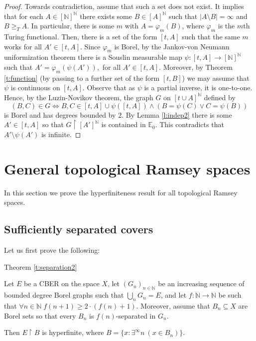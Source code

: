 \documentclass[11pt]{amsart}
\newcommand{\thistheoremname}{}
\newtheorem*{genericthm*}{\thistheoremname}
\newenvironment{namedthm*}[1]
{\renewcommand{\thistheoremname}{#1}%
	\begin{genericthm*}}
	{\end{genericthm*}}
\newcommand{\N}{\mathbb{N}}
\renewcommand{\restriction}[2]{#1 \upharpoonright #2}
\theoremstyle{definition}
\numberwithin{equation}{section}
\begin{document}
	\begin{proof}
		Towards contradiction, assume that such a set does not exist. It implies that for each $A \in [\N]^\N$ there exists some $B \in [A]^\N$ such that $|A \setminus B|=\infty$ and $B \geq_T A$. In particular, there is some $m$ with $A=\varphi_m(B)$, where $\varphi_m$ is the $m$th Turing functional. Then, there is a set of the form $[t,A]$ such that the same $m$ works for all $A' \in [t,A]$. Since $\varphi_m$ is Borel, by the Jankov-von Neumann uniformization theorem there is a Souslin measurable map $\psi: [t,A] \to [\N]^\N$ such that $A'=\varphi_m(\psi(A')),$ for all $A' \in [t,A].$ Moreover, by Theorem \ref{t:function} (by passing to a further set of the form $[t,B]$) we may assume that $\psi$ is continuous on $[t,A]$. Observe that as $\psi$ is a partial inverse, it is one-to-one. Hence, by the Luzin-Novikov theorem, the graph $G$ on $[t\cup A]^\N$ defined by \[(B,C) \in G \iff B,C \in [t,A] \cup \psi([t,A]) \land (B=\psi(C) \lor C=\psi(B))\] is Borel and has degrees bounded by $2$. By Lemma \ref{l:indep2} there is some $A' \in [t,A]$ so that $\restriction{G}{[A']^\N}$ is contained in $\mathbb{E}_0$. This contradicts that $A' \setminus \psi(A')$ is infinite. 
	\end{proof}
	
	
	
	
	
	\section{General topological Ramsey spaces}
	
	\label{s:main}
	
	In this section we prove the hyperfiniteness result for all topological Ramsey spaces. 
	\subsection{Sufficiently separated covers}
	\label{s:suffsep}
	
	Let us first prove the following:
	\begin{namedthm*}{Theorem \ref{t:separation2}}
		
		Let $E$ be a CBER on the space $X$, let $(G_n)_{n \in \N}$ be an increasing sequence of bounded degree Borel graphs such that $\bigcup_n G_n=E$, and let $f:\N\to\N$ be such that $\forall n\in\N\; f(n+1)\ge2\cdot(f(n)+1)$. Moreover, assume that $B_n \subseteq X$ are Borel sets so that every $B_n$ is $f(n)$-separated in $G_n$. 
		
		Then $\restriction{E}{B}$ is hyperfinite, where $B=\{x:\exists^\infty n \ (x \in B_n)\}$.
	\end{namedthm*}
	
\end{document}
